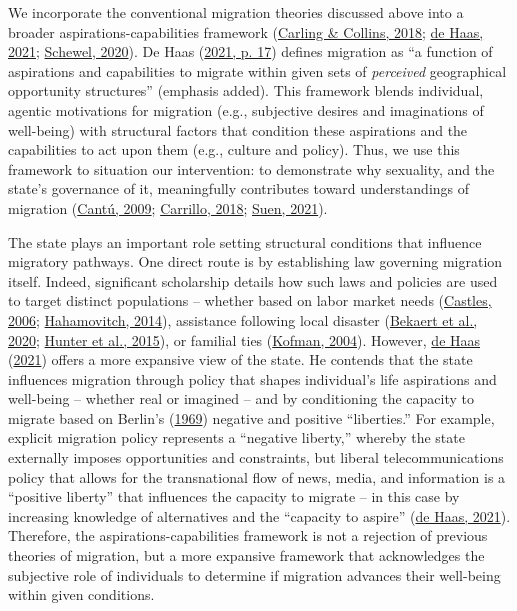 \documentclass[
  12pt,
]{article}
\begin{document}
We incorporate the conventional migration theories discussed above into a broader aspirations-capabilities framework (\protect\hyperlink{ref-carling_2018_aspiration}{Carling \& Collins, 2018}; \protect\hyperlink{ref-dehaas_2021}{de Haas, 2021}; \protect\hyperlink{ref-schewel_2020}{Schewel, 2020}). De Haas (\protect\hyperlink{ref-dehaas_2021}{2021, p. 17}) defines migration as ``a function of aspirations and capabilities to migrate within given sets of \emph{perceived} geographical opportunity structures'' (emphasis added). This framework blends individual, agentic motivations for migration (e.g., subjective desires and imaginations of well-being) with structural factors that condition these aspirations and the capabilities to act upon them (e.g., culture and policy). Thus, we use this framework to situation our intervention: to demonstrate why sexuality, and the state's governance of it, meaningfully contributes toward understandings of migration (\protect\hyperlink{ref-cantu_2009}{Cantú, 2009}; \protect\hyperlink{ref-carrillo_2018}{Carrillo, 2018}; \protect\hyperlink{ref-suen_2021_sexual}{Suen, 2021}).

The state plays an important role setting structural conditions that influence migratory pathways. One direct route is by establishing law governing migration itself. Indeed, significant scholarship details how such laws and policies are used to target distinct populations -- whether based on labor market needs (\protect\hyperlink{ref-castles_2006}{Castles, 2006}; \protect\hyperlink{ref-hahamovitch_2014}{Hahamovitch, 2014}), assistance following local disaster (\protect\hyperlink{ref-bekaert_2020}{Bekaert et al., 2020}; \protect\hyperlink{ref-hunter_2015}{Hunter et al., 2015}), or familial ties (\protect\hyperlink{ref-kofman_2004_family}{Kofman, 2004}). However, \protect\hyperlink{ref-dehaas_2021}{de Haas} (\protect\hyperlink{ref-dehaas_2021}{2021}) offers a more expansive view of the state. He contends that the state influences migration through policy that shapes individual's life aspirations and well-being -- whether real or imagined -- and by conditioning the capacity to migrate based on Berlin's (\protect\hyperlink{ref-berlin_1969_four}{1969}) negative and positive ``liberties.'' For example, explicit migration policy represents a ``negative liberty,'' whereby the state externally imposes opportunities and constraints, but liberal telecommunications policy that allows for the transnational flow of news, media, and information is a ``positive liberty'' that influences the capacity to migrate -- in this case by increasing knowledge of alternatives and the ``capacity to aspire'' (\protect\hyperlink{ref-dehaas_2021}{de Haas, 2021}). Therefore, the aspirations-capabilities framework is not a rejection of previous theories of migration, but a more expansive framework that acknowledges the subjective role of individuals to determine if migration advances their well-being within given conditions.
\end{document}
